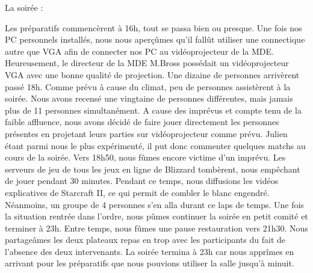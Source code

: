 La soirée :

Les préparatifs commencèrent à 16h, tout se passa bien ou presque. Une fois nos PC personnels 
installés, nous nous aperçûmes qu’il fallût utiliser une connectique autre que VGA afin de 
connecter nos PC au vidéoprojecteur de la MDE. Heureusement, le directeur de la MDE M.Bross 
possédait un vidéoprojecteur VGA avec une bonne qualité de projection.
Une dizaine de personnes arrivèrent passé 18h. Comme prévu à cause du climat, peu de
personnes assistèrent à la soirée. Nous avons recensé une vingtaine de personnes
différentes, mais jamais plus de 11 personnes simultanément.
A cause des imprévus et compte tenu de la faible affluence, nous avons décidé de faire jouer
directement les personnes présentes en projetant leurs parties sur vidéoprojecteur comme
prévu. Julien étant parmi nous le plus expérimenté, il put donc commenter quelques matchs
au cours de la soirée.
Vers 18h50, nous fûmes encore victime d’un imprévu. Les serveurs de jeu de tous les jeux en
ligne de Blizzard tombèrent, nous empêchant de jouer pendant 30 minutes. Pendant ce
temps, nous diffusions les vidéos explicatives de Starcraft II, ce qui permit de combler le
blanc engendré. Néanmoins, un groupe de 4 personnes s’en alla durant ce laps de temps.
Une fois la situation rentrée dans l’ordre, nous pûmes continuer la soirée en petit comité et
terminer à 23h. Entre temps, nous fûmes une pause restauration vers 21h30. Nous
partageâmes les deux plateaux repas en trop avec les participants du fait de l’absence des
deux intervenants. La soirée termina à 23h car nous apprîmes en arrivant pour les préparatifs
que nous pouvions utiliser la salle jusqu’à minuit.

